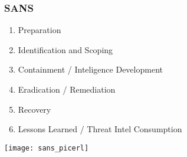 \subsubsection{SANS}
\begin{enumerate}
    \item Preparation
    \item Identification and Scoping
    \item Containment / Inteligence Development
    \item Eradication / Remediation
    \item Recovery
    \item Lessons Learned / Threat Intel Consumption
\end{enumerate}

\begin{center}
    \texttt{[image: sans\_picerl]}
    \vspace{-8pt}
\end{center}
